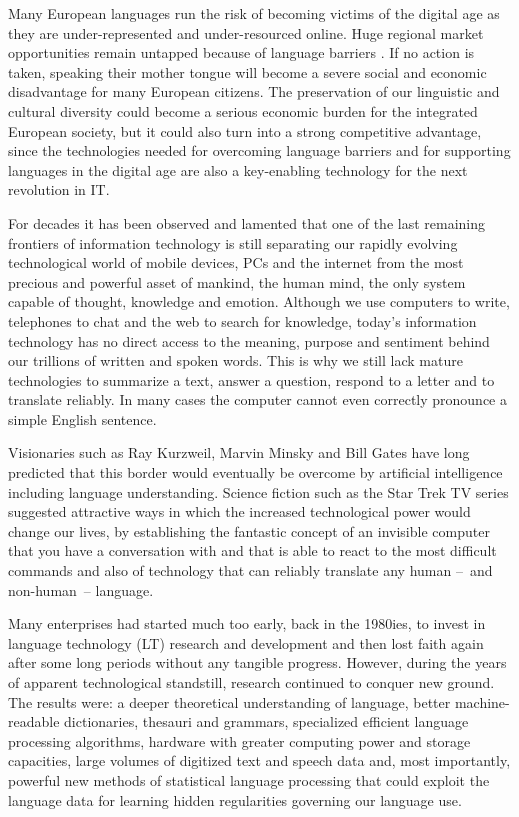 \documentclass[10pt, plain]{../../metanetpaper}
\begin{document}

\begin{multicols}{2}

  Many European languages run the risk of becoming victims of the digital age as they are under-represented and under-resourced online. Huge regional market opportunities remain untapped because of language barriers \cite{EC3, EC6}. If no action is taken, speaking their mother tongue will become a severe social and economic disadvantage for many European citizens. The preservation of our linguistic and cultural diversity could become a serious economic burden for the integrated European society, but it could also turn into a strong competitive advantage, since the technologies needed for overcoming language barriers and for supporting languages in the digital age are also a key-enabling technology for the next revolution in IT.

  For decades it has been observed and lamented that one of the last remaining frontiers of information technology is still separating our rapidly evolving technological world of mobile devices, PCs and the internet from the most precious and powerful asset of mankind, the human mind, the only system capable of thought, knowledge and emotion. Although we use computers to write, telephones to chat and the web to search for knowledge, today's information technology has no direct access to the meaning, purpose and sentiment behind our trillions of written and spoken words. This is why we still lack mature technologies to summarize a text, answer a question, respond to a letter and to translate reliably. In many cases the computer cannot even correctly pronounce a simple English sentence.

Visionaries such as Ray Kurzweil, Marvin Minsky and Bill Gates have long predicted that this border would eventually be overcome by artificial intelligence including language understanding. Science fiction such as the Star Trek TV series suggested attractive ways in which the increased technological power would change our lives, by establishing the fantastic concept of an invisible computer that you have a conversation with and that is able to react to the most difficult commands and also of technology that can reliably translate any human --~and non-human~-- language.

Many enterprises had started much too early, back in the 1980ies, to invest in language technology (LT) research and development and then lost faith again after some long periods without any tangible progress. However, during the years of apparent technological standstill, research continued to conquer new ground. The results were: a deeper theoretical understanding of language, better machine-readable dictionaries, thesauri and grammars, specialized efficient language processing algorithms, hardware with greater computing power and storage capacities, large volumes of digitized text and speech data and, most importantly, powerful new methods of statistical language processing that could exploit the language data for learning hidden regularities governing our language use.


\end{multicols}
\end{document}
